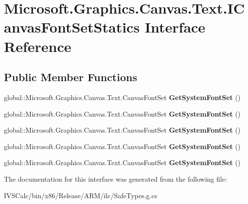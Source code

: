 \hypertarget{interface_microsoft_1_1_graphics_1_1_canvas_1_1_text_1_1_i_canvas_font_set_statics}{}\section{Microsoft.\+Graphics.\+Canvas.\+Text.\+I\+Canvas\+Font\+Set\+Statics Interface Reference}
\label{interface_microsoft_1_1_graphics_1_1_canvas_1_1_text_1_1_i_canvas_font_set_statics}
\subsection*{Public Member Functions}
\begin{DoxyCompactItemize}
\item 
\mbox{\label{interface_microsoft_1_1_graphics_1_1_canvas_1_1_text_1_1_i_canvas_font_set_statics_a43d38c14047f90b0c8b53da6ec4f4f9a}} 
global\+::\+Microsoft.\+Graphics.\+Canvas.\+Text.\+Canvas\+Font\+Set {\bfseries Get\+System\+Font\+Set} ()
\item 
\mbox{\label{interface_microsoft_1_1_graphics_1_1_canvas_1_1_text_1_1_i_canvas_font_set_statics_a43d38c14047f90b0c8b53da6ec4f4f9a}} 
global\+::\+Microsoft.\+Graphics.\+Canvas.\+Text.\+Canvas\+Font\+Set {\bfseries Get\+System\+Font\+Set} ()
\item 
\mbox{\label{interface_microsoft_1_1_graphics_1_1_canvas_1_1_text_1_1_i_canvas_font_set_statics_a43d38c14047f90b0c8b53da6ec4f4f9a}} 
global\+::\+Microsoft.\+Graphics.\+Canvas.\+Text.\+Canvas\+Font\+Set {\bfseries Get\+System\+Font\+Set} ()
\item 
\mbox{\label{interface_microsoft_1_1_graphics_1_1_canvas_1_1_text_1_1_i_canvas_font_set_statics_a43d38c14047f90b0c8b53da6ec4f4f9a}} 
global\+::\+Microsoft.\+Graphics.\+Canvas.\+Text.\+Canvas\+Font\+Set {\bfseries Get\+System\+Font\+Set} ()
\item 
\mbox{\label{interface_microsoft_1_1_graphics_1_1_canvas_1_1_text_1_1_i_canvas_font_set_statics_a43d38c14047f90b0c8b53da6ec4f4f9a}} 
global\+::\+Microsoft.\+Graphics.\+Canvas.\+Text.\+Canvas\+Font\+Set {\bfseries Get\+System\+Font\+Set} ()
\end{DoxyCompactItemize}


The documentation for this interface was generated from the following file\+:\begin{DoxyCompactItemize}
\item 
I\+V\+S\+Calc/bin/x86/\+Release/\+A\+R\+M/ilc/Safe\+Types.\+g.\+cs\end{DoxyCompactItemize}
